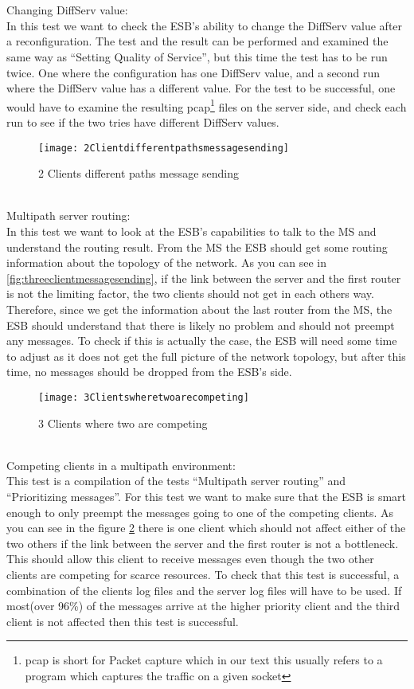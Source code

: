 \\\\
Changing DiffServ value:\\
    In this test we want to check the ESB’s ability to change the DiffServ value after a reconfiguration. The test and the result can be performed and examined the same way as “Setting Quality of Service”, but this time the test has to be run twice. One where the configuration has one DiffServ value, and a second run where the DiffServ value has a different value. For the test to be successful, one would have to examine the resulting \gls{pcap}\footnote{\Gls{pcap} is short for Packet capture which in our text this usually refers to a program which captures the traffic on a given socket} files on the server side, and check each run to see if the two tries have different DiffServ values.
\\
    \begin{figure}[h]
        \centering
        \texttt{[image: 2Clientdifferentpathsmessagesending]}
        \caption{2 Clients different paths message sending}
        \label{fig:2 Clients different paths message sending}
    \end{figure}
\\    
Multipath server routing:\\
    In this test we want to look at the ESB’s capabilities to talk to the MS and understand the routing result. From the MS the ESB should get some routing information about the topology of the network. As you can see in \ref{fig:threeclientmessagesending}, if the link between the server and the first router is not the limiting factor, the two clients should not get in each others way. Therefore, since we get the information about the last router from the MS, the ESB should understand that there is likely no problem and should not preempt any messages. To check if this is actually the case, the ESB will need some time to adjust as it does not get the full picture of the network topology, but after this time, no messages should be dropped from the ESB’s side.
\\
    \begin{figure}[h]
        \centering
        \texttt{[image: 3Clientswheretwoarecompeting]}
        \caption{3 Clients where two are competing}
        \label{fig:3clientstwocompeting}
    \end{figure}
\\
Competing clients in a multipath environment:\\
    This test is a compilation of the tests “Multipath server routing” and “Prioritizing messages”. For this test we want to make sure that the ESB is smart enough to only preempt the messages going to one of the competing clients. As you can see in the figure \ref{fig:3clientstwocompeting} there is one client which should not affect either of the two others if the link between the server and the first router is not a bottleneck. This should allow this client to receive messages even though the two other clients are competing for scarce resources. To check that this test is successful, a combination of the clients log files and the server log files will have to be used. If most(over 96\%) of the messages arrive at the higher priority client and the third client is not affected then this test is successful.
